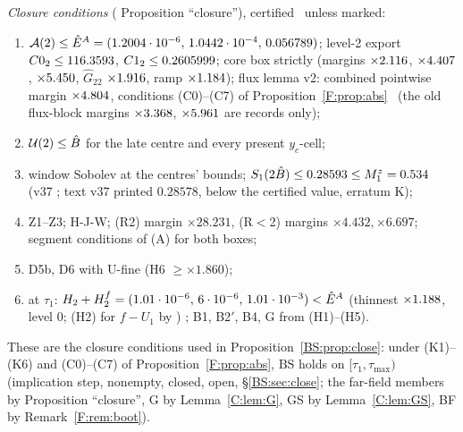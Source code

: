 \documentclass[11pt]{article}
\begin{document}
\noindent\emph{Closure conditions} ( Proposition ``closure''), certified \tC\ unless marked:
\begin{enumerate}[label=(K\arabic*),leftmargin=2.6em]
\item $\mathcal A(2)\le\hat E^A=(1.2004\cdot10^{-6},\,1.0442\cdot10^{-4},\,0.056789)$; level-2 export $C0_2\le116.3593$, $C1_2\le0.2605999$; core box strictly (margins $\times2.116$, $\times4.407$, $\times5.450$, $\hat G_{22}$ $\times1.916$, ramp $\times1.184$); flux lemma v2: combined pointwise margin $\times4.804$, conditions (C0)--(C7) of Proposition~\ref{F:prop:abs} \tC\ (the old flux-block margins $\times3.368$, $\times5.961$ are records only);
\item $\mathcal U(2)\le\hat B$ for the late centre and every present $y_c$-cell;
\item window Sobolev at the centres' bounds; $S_1(2\hat B)\le0.28593\le M_1^z=0.534$ (v37 ; text v37 printed $0.28578$, below the certified value, erratum K);
\item Z1--Z3; H-J-W; (R2) margin $\times28.231$, (R$<$2) margins $\times4.432,\times6.697$; segment conditions of (A) for both boxes;
\item D5b, D6 with U-fine (H6 $\ge\times1.860$);
\item at $\tau_1$: $H_2+H^f_2=(1.01\cdot10^{-6},\,6\cdot10^{-6},\,1.01\cdot10^{-3})<\hat E^A$ (thinnest $\times1.188$, level 0; (H2) for $f-U_1$ by ) \tB; B1, B2$'$, B4, G from (H1)--(H5).
\end{enumerate}
These are the closure conditions used in Proposition~\ref{BS:prop:close}: under (K1)--(K6) and (C0)--(C7) of Proposition~\ref{F:prop:abs}, $\mathrm{BS}$ holds on $[\tau_1,\tau_{\max})$ (implication step, nonempty, closed, open, \S\ref{BS:sec:close}; the far-field members by  Proposition ``closure'', G by Lemma~\ref{C:lem:G}, GS by Lemma~\ref{C:lem:GS}, BF by Remark~\ref{F:rem:boot}).



\end{document}
